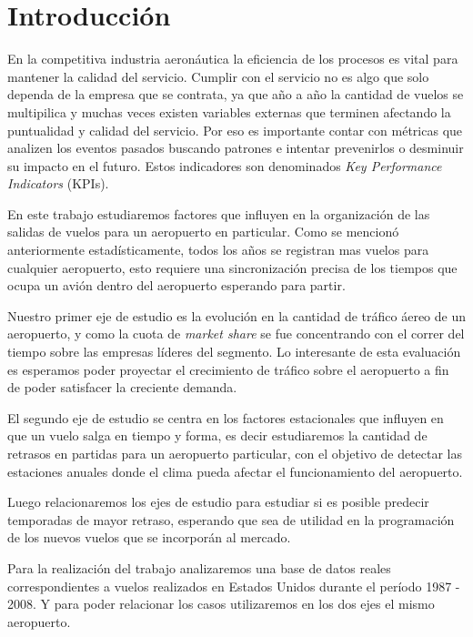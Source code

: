 \documentclass{endm}
\begin{document}
\section{Introducción}\label{intro}

En la competitiva industria aeron\'autica la eficiencia de los procesos es vital para mantener la calidad del servicio. Cumplir con el servicio no es algo que solo dependa de la empresa que se contrata, ya que año a año la cantidad de vuelos se multipilica y muchas veces existen variables externas que terminen afectando la puntualidad y calidad del servicio. Por eso es importante contar con m\'etricas que analizen los eventos pasados buscando patrones e intentar prevenirlos o desminuir su impacto en el futuro. Estos indicadores son denominados \textit{Key Performance Indicators} (KPIs).

En este trabajo estudiaremos factores que influyen en la organización de las salidas de vuelos para un aeropuerto en particular. Como se mencion\'o anteriormente estad\'isticamente, todos los años se registran mas vuelos para cualquier aeropuerto, esto requiere una sincronizaci\'on precisa de los tiempos que ocupa un avi\'on dentro del aeropuerto esperando para partir.

Nuestro primer eje de estudio es la evoluci\'on en la cantidad de tr\'afico \'aereo de un aeropuerto, y como la cuota de \textit{market share} se fue concentrando con el correr del tiempo sobre las empresas l\'ideres del segmento. Lo interesante de esta evaluaci\'on es esperamos poder proyectar el crecimiento de tr\'afico sobre el aeropuerto a fin de poder satisfacer la creciente demanda.

El segundo eje de estudio se centra en los factores estacionales que influyen en que un vuelo salga en tiempo y forma, es decir estudiaremos la cantidad de retrasos en partidas para un aeropuerto particular, con el objetivo de detectar las estaciones anuales donde el clima pueda afectar el funcionamiento del aeropuerto.

Luego relacionaremos los ejes de estudio para estudiar si es posible predecir temporadas de mayor retraso, esperando que sea de utilidad en la programaci\'on de los nuevos vuelos que se incorporán al mercado.

Para la realización del trabajo analizaremos una base de datos reales correspondientes a vuelos realizados en Estados Unidos durante el per\'iodo 1987 - 2008. Y para poder relacionar los casos utilizaremos en los dos ejes el mismo aeropuerto.
\end{document}
